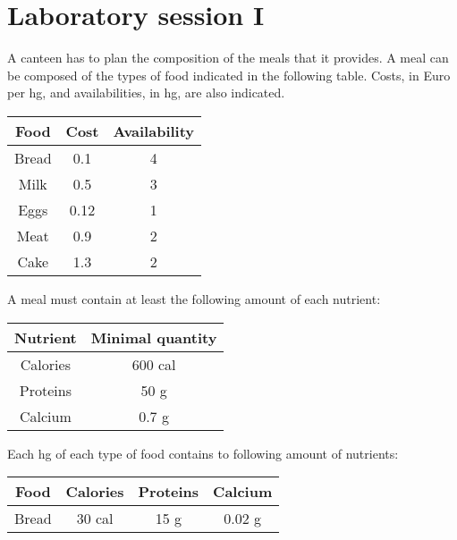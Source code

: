 \documentclass[12pt, a4paper]{report}
\newtheorem[style=M,bodystyle=\normalfont]{theorem}{Theorem}
\newtheorem[style=M,bodystyle=\normalfont]{corollary}{Corollary}
\newtheorem[style=M,bodystyle=\normalfont]{lemma}{Lemma}
\newtheorem[style=M,bodystyle=\normalfont]{definition}{Definition}
\begin{document}
\newpage

\chapter{Laboratory session I}
\begin{Exercise}[label=1]
    A canteen has to plan the composition of the meals that it provides. A meal can be composed of the types of food indicated in the following table. 
    Costs, in Euro per hg, and availabilities, in hg, are also indicated.
    \begin{table}[H]
        \centering
        \begin{tabular}{|c|c|c|}
        \hline
        \textbf{Food} & \textbf{Cost} & \textbf{Availability} \\ \hline
        Bread         & 0.1           & 4                     \\
        Milk          & 0.5           & 3                     \\
        Eggs          & 0.12          & 1                     \\
        Meat          & 0.9           & 2                     \\
        Cake          & 1.3           & 2                     \\ \hline
        \end{tabular}
    \end{table}
    A meal must contain at least the following amount of each nutrient: 
    \begin{table}[H]
        \centering
        \begin{tabular}{|c|c|}
        \hline
        Nutrient & Minimal quantity \\ \hline
        Calories & 600 cal          \\
        Proteins & 50 g             \\
        Calcium  & 0.7 g            \\ \hline
        \end{tabular}
    \end{table}
    Each hg of each type of food contains to following amount of nutrients: 
    \begin{table}[H]
        \centering
        \begin{tabular}{|cccc|}
        \hline
        \textbf{Food}               & \textbf{Calories}            & \textbf{Proteins}         & \textbf{Calcium} \\ \hline
        \multicolumn{1}{|c|}{Bread} & \multicolumn{1}{c|}{30 cal}  & \multicolumn{1}{c|}{15 g} & 0.02 g           \\

\end{tabular}
\end{table}
\end{Exercise}
\end{document}
